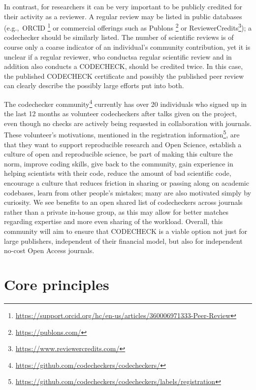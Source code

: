 \documentclass[12pt]{article}
\begin{document}
In contrast, for researchers it can be very important to be publicly credited
for their activity as a reviewer.
A regular
review may be listed in public databases (e.g.,~ORCID
\footnote{\href{https://support.orcid.org/hc/en-us/articles/360006971333-Peer-Review}{https://support.orcid.org/hc/en-us/articles/360006971333-Peer-Review}} or commercial offerings such as Publons
\footnote{\href{https://publons.com/}{https://publons.com/}} or 
ReviewerCredits\footnote{\href{https://www.reviewercredits.com/}{https://www.reviewercredits.com/}});
a codechecker should be similarly listed.
The number of scientific reviews is of course only a coarse indicator of an individual's community contribution, yet it is unclear if a regular reviewer, who conductsa regular scientific review and in addition also conducts a CODECHECK, should be credited twice.
In this case, the published CODECHECK certificate and possibly the published peer review can clearly describe the possibly large efforts put into both.

The codechecker community\footnote{\href{https://github.com/codecheckers/codecheckers/}{https://github.com/codecheckers/codecheckers/}}
currently has over 20 individuals who signed up in the last 12 months as volunteer codecheckers after talks given on the project, even though no checks are actively being requested in collaboration with journals.
These volunteer's motivations, mentioned in the registration information\footnote{\url{https://github.com/codecheckers/codecheckers/labels/registration}}, are that they want to
support reproducible research and Open Science,
establish a culture of open and reproducible science,
be part of making this culture the norm,
improve coding skills,
give back to the community,
gain experience in helping scientists with their code,
reduce the amount of bad scientific code, 
encourage a culture that reduces friction in sharing or passing along on academic codebases,
learn from other people's mistakes;
many are also motivated simply by curiosity.
We see benefits to an open shared list of codecheckers across journals rather than a private in-house group, as this may allow for better matches regarding expertise and more even sharing of the workload.
Overall, this community will aim to ensure that CODECHECK is a viable option not just for large publishers, independent of their financial model, but also for independent no-cost Open Access journals.

\section*{Core principles}\label{core-principles}
\end{document}
